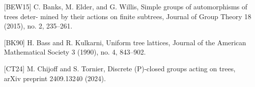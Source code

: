\documentclass[preview]{standalone}
\begin{document}
\begin{center}
[BEW15] C. Banks, M. Elder, and G. Willis, Simple groups of automorphisms of trees deter- mined by their actions on finite subtrees, Journal of Group Theory 18 (2015), no. 2, 235–261.
                        
                        [BK90] H. Bass and R. Kulkarni, Uniform tree lattices, Journal of the American Mathematical Society 3 (1990), no. 4, 843–902.

                        [CT24] M. Chijoff and S. Tornier, Discrete (P)-closed groups acting on trees, arXiv preprint 2409.13240 (2024).
\end{center}
\end{document}
